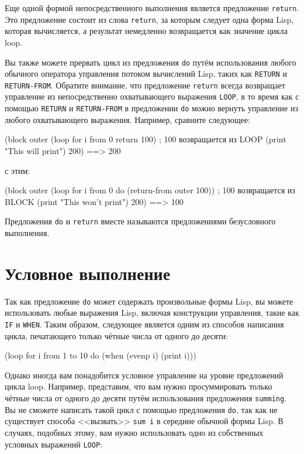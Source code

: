 Еще одной формой непосредственного выполнения является предложение \lstinline{return}. Это
предложение состоит из слова \lstinline{return}, за которым следует одна форма Lisp, которая
вычисляется, а результат немедленно возвращается как значение цикла loop.

Вы также можете прервать цикл из предложения \lstinline{do} путём использования любого обычного
оператора управления потоком вычислений Lisp, таких как \lstinline{RETURN} и
\lstinline{RETURN-FROM}. Обратите внимание, что предложение \lstinline{return} всегда возвращает
управление из непосредственно охватывающего выражения \lstinline{LOOP}, в то время как с
помощью \lstinline{RETURN} и \lstinline{RETURN-FROM} в предложении \lstinline{do} можно вернуть
управление из любого охватывающего выражения. Например, сравните следующее:

\begin{myverb}
(block outer
  (loop for i from 0 return 100) ; 100 возвращается из LOOP
  (print "This will print")
  200) ==> 200
\end{myverb}

\noindent{}с этим:

\begin{myverb}
(block outer
  (loop for i from 0 do (return-from outer 100)) ; 100 возвращается из BLOCK
  (print "This won't print")
  200) ==> 100
\end{myverb}

Предложения \lstinline{do} и \lstinline{return} вместе называются предложениями безусловного
выполнения.

\section{Условное выполнение}

Так как предложение \lstinline{do} может содержать произвольные формы Lisp, вы можете
использовать любые выражения Lisp, включая конструкции управления, такие как \lstinline{IF} и
\lstinline{WHEN}. Таким образом, следующее является одним из способов написания цикла,
печатающего только чётные числа от одного до десяти:

\begin{myverb}
(loop for i from 1 to 10 do (when (evenp i) (print i)))
\end{myverb}

Однако иногда вам понадобится условное управление на уровне предложений цикла
loop. Например, представим, что вам нужно просуммировать только чётные числа от одного до
десяти путём использования предложения \lstinline{summing}. Вы не сможете написать такой цикл с
помощью предложения \lstinline{do}, так как не существует способа <<вызвать>> \lstinline{sum i} в
середине обычной формы Lisp. В случаях, подобных этому, вам нужно использовать одно из
собственных условных выражений \lstinline{LOOP}:

